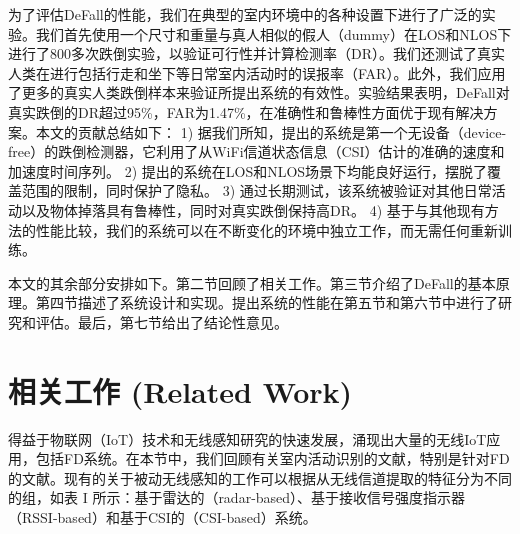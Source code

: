 \documentclass[journal]{IEEEtran}
\begin{document}
为了评估DeFall的性能，我们在典型的室内环境中的各种设置下进行了广泛的实验。我们首先使用一个尺寸和重量与真人相似的假人（dummy）在LOS和NLOS下进行了800多次跌倒实验，以验证可行性并计算检测率（DR）。我们还测试了真实人类在进行包括行走和坐下等日常室内活动时的误报率（FAR）。此外，我们应用了更多的真实人类跌倒样本来验证所提出系统的有效性。实验结果表明，DeFall对真实跌倒的DR超过95\%，FAR为1.47\%，在准确性和鲁棒性方面优于现有解决方案。本文的贡献总结如下：
1) 据我们所知，提出的系统是第一个无设备（device-free）的跌倒检测器，它利用了从WiFi信道状态信息（CSI）估计的准确的速度和加速度时间序列。
2) 提出的系统在LOS和NLOS场景下均能良好运行，摆脱了覆盖范围的限制，同时保护了隐私。
3) 通过长期测试，该系统被验证对其他日常活动以及物体掉落具有鲁棒性，同时对真实跌倒保持高DR。
4) 基于与其他现有方法的性能比较，我们的系统可以在不断变化的环境中独立工作，而无需任何重新训练。

本文的其余部分安排如下。第二节回顾了相关工作。第三节介绍了DeFall的基本原理。第四节描述了系统设计和实现。提出系统的性能在第五节和第六节中进行了研究和评估。最后，第七节给出了结论性意见。


\section{相关工作 (Related Work)}
得益于物联网（IoT）技术和无线感知研究的快速发展，涌现出大量的无线IoT应用，包括FD系统。在本节中，我们回顾有关室内活动识别的文献，特别是针对FD的文献。现有的关于被动无线感知的工作可以根据从无线信道提取的特征分为不同的组，如表 I 所示：基于雷达的（radar-based）、基于接收信号强度指示器（RSSI-based）和基于CSI的（CSI-based）系统。
\end{document}
